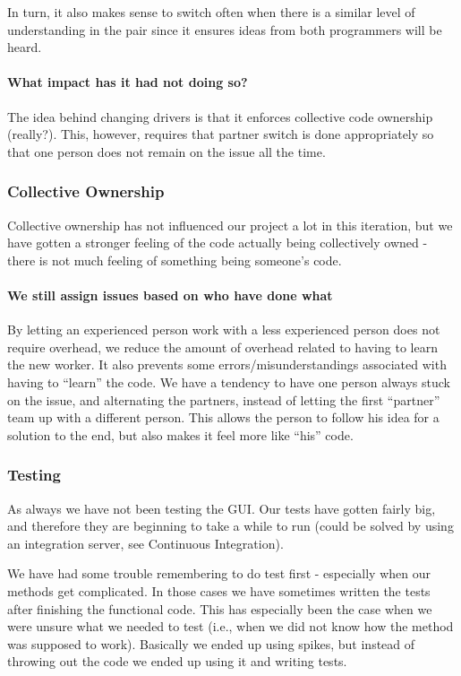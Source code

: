 In turn, it also makes sense to switch often when there is a similar level of understanding in the pair since it ensures ideas from both programmers will be heard.


\paragraph{What impact has it had not doing so?}
The idea behind changing drivers is that it enforces collective code ownership (really?). This, however, requires that partner switch is done appropriately so that one person does not remain on the issue all the time.

\subsubsection{Collective Ownership}
Collective ownership has not influenced our project a lot in this iteration, but we have gotten a stronger feeling of the code actually being collectively owned - there is not much feeling of something being someone’s code.

\paragraph{We still assign issues based on who have done what}
By letting an experienced person work with a less experienced person does not require overhead, we reduce the amount of overhead related to having to learn the new worker. It also prevents some errors/misunderstandings associated with having to “learn” the code.
We have a tendency to have one person always stuck on the issue, and alternating the partners, instead of letting the first “partner” team up with a different person. This allows the person to follow his idea for a solution to the end, but also makes it feel more like “his” code.


\subsubsection{Testing}
As always we have not been testing the GUI. Our tests have gotten fairly big, and therefore they are beginning to take a while to run (could be solved by using an integration server, see Continuous Integration).

We have had some trouble remembering to do test first - especially when our methods get complicated. In those cases we have sometimes written the tests after finishing the functional code. This has especially been the case when we were unsure what we needed to test (i.e., when we did not know how the method was supposed to work). Basically we ended up using spikes, but instead of throwing out the code we ended up using it and writing tests. 

